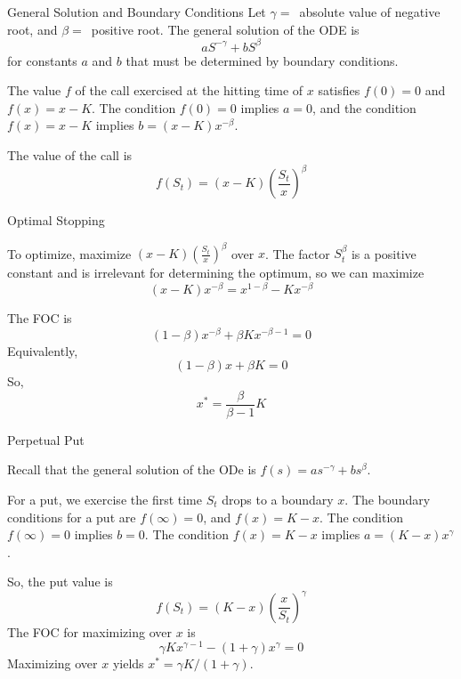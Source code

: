 \documentclass[xcolor=dvipsnames,10pt]{beamer}
\begin{document}
\begin{frame}{General Solution and Boundary Conditions}
Let $\gamma=\,$ absolute value of negative root, and $\beta=\,$ positive root.  The general solution of the ODE is
$$aS^{-\gamma} + bS^\beta$$
for constants $a$ and $b$ that must be determined by boundary conditions.

The value $f$ of the call exercised at the hitting time of $x$ satisfies $f(0)=0$ and $f(x) = x-K$.  The condition $f(0)=0$ implies $a=0$, and the condition $f(x)=x-K$ implies $b=(x-K)x^{-\beta}$.  

The value of the call is
$$f(S_t) = (x-K)\left(\frac{S_t}{x}\right)^\beta$$
    
\end{frame}

\begin{frame}{Optimal Stopping}

To optimize, maximize $(x-K)\left(\frac{S_t}{x}\right)^\beta$ over $x$. 
The factor $S_t^\beta$ is a positive constant and is irrelevant for determining the optimum, so we can maximize
$$(x-K)x^{-\beta} = x^{1-\beta} - Kx^{-\beta}$$

The FOC is
$$(1-\beta)x^{-\beta} + \beta Kx^{-\beta-1}=0$$
Equivalently,
$$(1-\beta)x + \beta K=0$$
So, 
$$x^* = \frac{\beta}{\beta-1}K$$
    
\end{frame}

\begin{frame}{Perpetual Put}

Recall that the general solution of the ODe is $f(s) = as^{-\gamma} + bs^\beta$.

For a put, we exercise the first time $S_t$ drops to a boundary $x$.  
The boundary conditions for a put are $f(\infty)=0$, and $f(x)=K-x$.  The condition $f(\infty)=0$ implies $b=0$.  The condition $f(x)=K-x$ implies $a=(K-x)x^{\gamma}$.

So, the put value is 
$$f(S_t) = (K-x)\left(\frac{x}{S_t}\right)^\gamma$$
The FOC for maximizing over $x$ is
$$\gamma K x^{\gamma-1} - (1+\gamma)x^\gamma =0$$
Maximizing over $x$ yields $x^*=\gamma K/(1+\gamma)$.

    
\end{frame}
\end{document}
